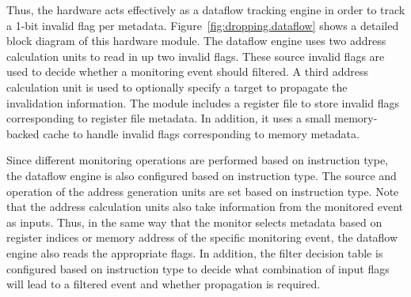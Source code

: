 Thus, the hardware acts effectively as a dataflow tracking engine in order to
track a 1-bit invalid flag per metadata. Figure~\ref{fig:dropping.dataflow} shows a detailed block
diagram of this hardware module. The dataflow engine uses two address
calculation units to read in up two invalid flags. These source invalid flags
are used to decide whether a monitoring event should filtered. A third address
calculation unit is used to optionally specify a target to propagate the
invalidation information. The module includes a register file to store invalid
flags corresponding to register file metadata. In addition, it uses a small
memory-backed cache to handle invalid flags corresponding to memory metadata.

Since different monitoring operations are performed based on instruction type,
the dataflow engine is also configured based on instruction type. The source
and operation of the address generation units are set based on instruction
type. Note that the address calculation units also take information from the
monitored event as inputs. Thus, in the same way that the monitor selects
metadata based on register indices or memory address of the specific monitoring
event, the dataflow engine also reads the appropriate flags. In addition, the
filter decision table is configured based on instruction type to decide what
combination of input flags will lead to a filtered event and whether
propagation is required.



